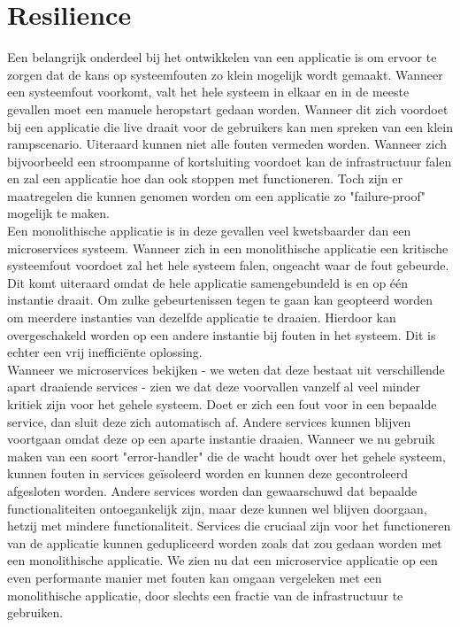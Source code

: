 \section{Resilience}
\label{sec:resilience}

Een belangrijk onderdeel bij het ontwikkelen van een applicatie is om ervoor te zorgen dat de kans op systeemfouten zo klein mogelijk wordt gemaakt. Wanneer een systeemfout voorkomt, valt het hele systeem in elkaar en in de meeste gevallen moet een manuele heropstart gedaan worden. Wanneer dit zich voordoet bij een applicatie die live draait voor de gebruikers kan men spreken van een klein rampscenario. Uiteraard kunnen niet alle fouten vermeden worden. Wanneer zich bijvoorbeeld een stroompanne of kortsluiting voordoet kan de infrastructuur falen en zal een applicatie hoe dan ook stoppen met functioneren. Toch zijn er maatregelen die kunnen genomen worden om een applicatie zo "failure-proof" mogelijk te maken.
\\
Een monolithische applicatie is in deze gevallen veel kwetsbaarder dan een microservices systeem. Wanneer zich in een monolithische applicatie een kritische systeemfout voordoet zal het hele systeem falen, ongeacht waar de fout gebeurde. Dit komt uiteraard omdat de hele applicatie samengebundeld is en op één instantie draait. Om zulke gebeurtenissen tegen te gaan kan geopteerd worden om meerdere instanties van dezelfde applicatie te draaien. Hierdoor kan overgeschakeld worden op een andere instantie bij fouten in het systeem. Dit is echter een vrij inefficiënte oplossing.
\\
Wanneer we microservices bekijken - we weten dat deze bestaat uit verschillende apart draaiende services - zien we dat deze voorvallen vanzelf al veel minder kritiek zijn voor het gehele systeem. Doet er zich een fout voor in een bepaalde service, dan sluit deze zich automatisch af. Andere services kunnen blijven voortgaan omdat deze op een aparte instantie draaien. Wanneer we nu gebruik maken van een soort "error-handler" die de wacht houdt over het gehele systeem, kunnen fouten in services geïsoleerd worden en kunnen deze gecontroleerd afgesloten worden. Andere services worden dan gewaarschuwd dat bepaalde functionaliteiten ontoegankelijk zijn, maar deze kunnen wel blijven doorgaan, hetzij met mindere functionaliteit. Services die cruciaal zijn voor het functioneren van de applicatie kunnen gedupliceerd worden zoals dat zou gedaan worden met een monolithische applicatie. We zien nu dat een microservice applicatie op een even performante manier met fouten kan omgaan vergeleken met een monolithische applicatie, door slechts een fractie van de infrastructuur te gebruiken.

